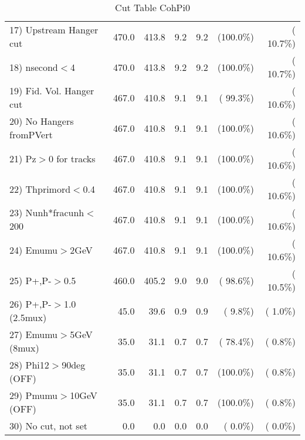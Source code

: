 \begin{table}[h!]
\begin{tabular}{||l||r|r|r|r|r|r||}
 17) Upstream Hanger cut  &        470.0 &        413.8 &          9.2 &          9.2 & (100.0\%) & ( 10.7\%) \\
 18) nsecond$<$4          &        470.0 &        413.8 &          9.2 &          9.2 & (100.0\%) & ( 10.7\%) \\
 19) Fid. Vol. Hanger cut &        467.0 &        410.8 &          9.1 &          9.1 & ( 99.3\%) & ( 10.6\%) \\
 20) No Hangers fromPVert &        467.0 &        410.8 &          9.1 &          9.1 & (100.0\%) & ( 10.6\%) \\
 21) Pz$>$0 for tracks    &        467.0 &        410.8 &          9.1 &          9.1 & (100.0\%) & ( 10.6\%) \\
 22) Thprimord$<$0.4      &        467.0 &        410.8 &          9.1 &          9.1 & (100.0\%) & ( 10.6\%) \\
 23) Nunh*fracunh$<$200   &        467.0 &        410.8 &          9.1 &          9.1 & (100.0\%) & ( 10.6\%) \\
 24) Emumu$>$2GeV         &        467.0 &        410.8 &          9.1 &          9.1 & (100.0\%) & ( 10.6\%) \\
 25) P+,P-$>$0.5          &        460.0 &        405.2 &          9.0 &          9.0 & ( 98.6\%) & ( 10.5\%) \\
 26) P+,P-$>$1.0 (2.5mux) &         45.0 &         39.6 &          0.9 &          0.9 & (  9.8\%) & (  1.0\%) \\
 27) Emumu$>$5GeV  (8mux) &         35.0 &         31.1 &          0.7 &          0.7 & ( 78.4\%) & (  0.8\%) \\
 28) Phi12$>$90deg  (OFF) &         35.0 &         31.1 &          0.7 &          0.7 & (100.0\%) & (  0.8\%) \\
 29) Pmumu$>$10GeV  (OFF) &         35.0 &         31.1 &          0.7 &          0.7 & (100.0\%) & (  0.8\%) \\
 30) No cut, not set      &          0.0 &          0.0 &          0.0 &          0.0 & (  0.0\%) & (  0.0\%) \\
 \hline
 \hline
 \end{tabular}
 \caption{Cut Table  CohPi0   }
 \label{tab-cutheavy_neutrino_0.500}
 \end{table}
